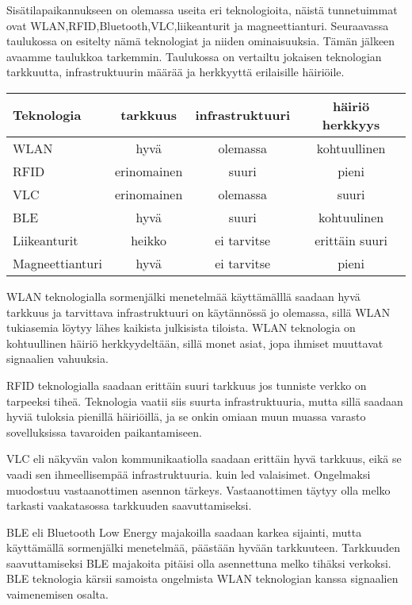Sisätilapaikannukseen on olemassa useita eri teknologioita, näistä tunnetuimmat ovat WLAN,RFID,Bluetooth,VLC,liikeanturit ja magneettianturi. Seuraavassa taulukossa on esitelty nämä teknologiat ja niiden ominaisuuksia. Tämän jälkeen avaamme taulukkoa tarkemmin. Taulukossa on vertailtu jokaisen teknologian tarkkuutta, infrastruktuurin määrää ja herkkyyttä erilaisille häiriöile.
\begin{center}
  \begin{tabular}{| l || c | c | c| }
    \hline
	Teknologia & tarkkuus & infrastruktuuri & häiriö herkkyys\\ \hline\hline
	WLAN & hyvä & olemassa & kohtuullinen\\ \hline
    	RFID & erinomainen & suuri & pieni\\ \hline
	VLC & erinomainen & olemassa & suuri\\ \hline
	BLE & hyvä & suuri & kohtuulinen\\ \hline
	Liikeanturit & heikko & ei tarvitse & erittäin suuri\\ \hline
	Magneettianturi & hyvä & ei tarvitse & pieni\\
    \hline
  \end{tabular}
\end{center}

WLAN teknologialla sormenjälki menetelmää käyttämälllä saadaan hyvä tarkkuus ja tarvittava infrastruktuuri on käytännössä jo olemassa, sillä WLAN tukiasemia löytyy lähes kaikista julkisista tiloista. WLAN teknologia on kohtuullinen häiriö herkkyydeltään, sillä monet asiat, jopa ihmiset muuttavat signaalien vahuuksia.

RFID teknologialla saadaan erittäin suuri tarkkuus jos tunniste verkko on tarpeeksi tiheä. Teknologia vaatii siis suurta infrastruktuuria, mutta sillä saadaan hyviä tuloksia pienillä häiriöillä, ja se onkin omiaan muun muassa varasto sovelluksissa tavaroiden paikantamiseen.

VLC eli näkyvän valon kommunikaatiolla saadaan erittäin hyvä tarkkuus, eikä se vaadi sen ihmeellisempää infrastruktuuria. kuin led valaisimet. Ongelmaksi muodostuu vastaanottimen asennon tärkeys. Vastaanottimen täytyy olla melko tarkasti vaakatasossa tarkkuuden saavuttamiseksi.

BLE eli Bluetooth Low Energy majakoilla saadaan karkea sijainti, mutta käyttämällä sormenjälki menetelmää, päästään hyvään tarkkuuteen. Tarkkuuden saavuttamiseksi BLE majakoita pitäisi olla asennettuna melko tihäksi verkoksi. BLE teknologia kärsii samoista ongelmista WLAN teknologian kanssa signaalien vaimenemisen osalta.

